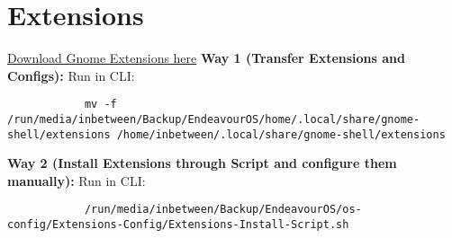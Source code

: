 \documentclass[12pt]{article}
\begin{document}
    \section{Extensions}\label{sec:extensions}
        \href{https://extensions.gnome.org/}{Download Gnome Extensions here}
        \newline
        \newline \textbf{Way 1 (Transfer Extensions and Configs):}
        \newline Run in CLI:
        \begin{verbatim}
            mv -f /run/media/inbetween/Backup/EndeavourOS/home/.local/share/gnome-shell/extensions /home/inbetween/.local/share/gnome-shell/extensions
        \end{verbatim}
        \textbf{Way 2 (Install Extensions through Script and configure them manually):}
        \newline Run in CLI:
        \begin{verbatim}
            /run/media/inbetween/Backup/EndeavourOS/os-config/Extensions-Config/Extensions-Install-Script.sh
        \end{verbatim}
\end{document}
